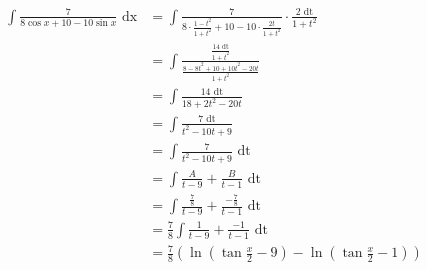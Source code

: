 \documentclass[a4paper,12pt]{article}
\newcommand{\?}{\stackrel{?}{=}}
\begin{document}
\begin{definition}
\begin{my_example}
\begin{align*}
  \int \frac{7}{8\cos x + 10 - 10\sin x} \text{ dx} &= \int \frac{7}{8 \cdot \frac{1 - t^2}{1 + t^2} + 10 - 10 \cdot \frac{2t}{1 + t^2}} \cdot \frac{2\text{ dt}}{1+t^2}\\
  &= \int \frac{\frac{14\text{ dt}}{1+t^2}}{\frac{8-8t^2+10+10t^2-20t}{1+t^2}}\\
  &= \int \frac{14\text{ dt}}{18+2t^2-20t}\\
  &= \int \frac{7\text{ dt}}{t^2-10t+9}\\
  &= \int \frac{7}{t^2-10t+9} \text{ dt}\\
  &= \int \frac{A}{t-9} + \frac{B}{t-1} \text{ dt}\\
  &= \int \frac{\frac78}{t-9} + \frac{-\frac78}{t-1} \text{ dt}\\
  &= \frac78 \int \frac{1}{t-9} + \frac{-1}{t-1} \text{ dt}\\
  &= \frac78\left(\ln\left(\tan\frac{x}{2}-9\right) -\ln\left(\tan\frac{x}{2}-1\right)\right)\\
\end{align*}
\end{my_example}
\end{definition}
\end{document}

